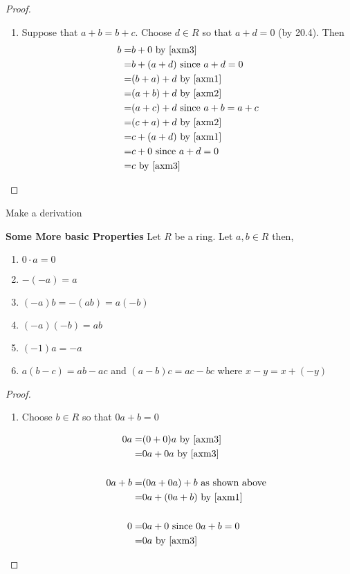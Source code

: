 \begin{proof}
\begin{enumerate}
\item Suppose that $a+b = b+c$. Choose $d\in R$ so that $a+d = 0$ (by 20.4). Then
\begin{align*}
    b = & b+0 \text{ by \ref{axm3} } \\
    = & b + (a + d) \text{ since } a+d = 0 \\
    =&  (b + a) + d \text{ by \ref{axm1} }\\
    = & (a + b) + d \text{ by \ref{axm2} }\\
    = & (a + c) + d \text{ since } a+b = a+c\\
    = & (c + a) + d \text{ by \ref{axm2} }\\
    = & c + (a + d) \text{ by \ref{axm1} }\\
    = & c + 0 \text{ since } a+d=0\\
    = & c\text{ by \ref{axm3} }
\end{align*}
\end{enumerate}
\end{proof}

\begin{exer}
Make a derivation
\end{exer}

\begin{thm} \textbf{Some More basic Properties}
Let $R$ be a ring. Let $a,b \in R$ then,
\begin{enumerate}
\item $0\cdot a = 0$
\item $- (-a) = a$
\item $(-a) b = -(ab) = a(-b)$
\item $(-a)(-b) = ab$
\item $(-1)a = -a$
\item $a(b-c) = ab-ac$ and $(a-b)c = ac-bc$ where $x-y = x + (-y)$
\end{enumerate}
\end{thm}

\begin{proof}
\begin{enumerate}
\item Choose \(b\in R\) so that \(0a + b = 0\)

\begin{align*}
    0a = & (0+0)a \text{ by \ref{axm3} }\\
    = & 0a + 0a \text{ by \ref{axm3} }\\ 
    \\
    0a + b = & (0a + 0a)+b \text{ as shown above } \\
    = & 0a + (0a + b) \text{ by \ref{axm1}} \\
    \\
    0 =& 0a + 0 \text{ since } 0a+b=0\\
    = & 0a \text{ by \ref{axm3}}
\end{align*}
\end{enumerate}
\end{proof}

